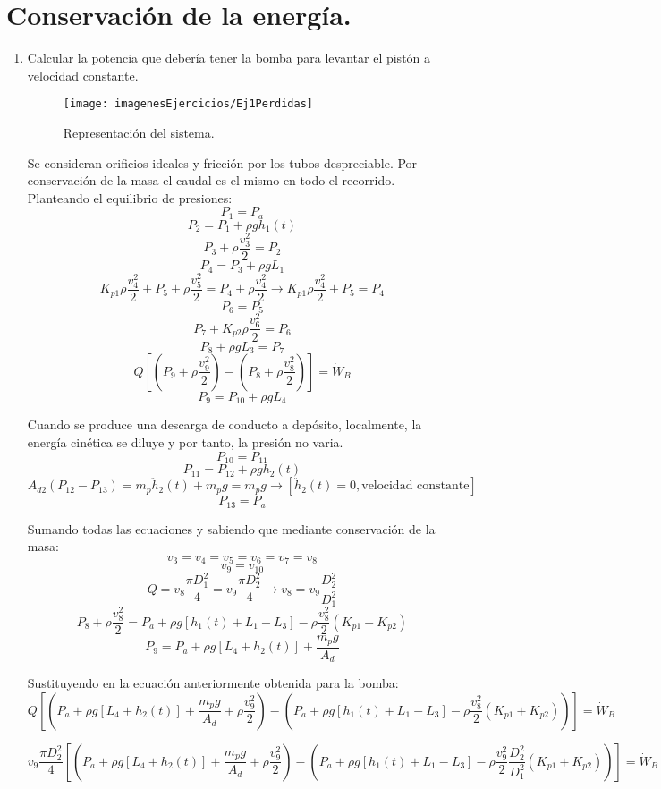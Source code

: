 \section{Conservación de la energía.}
\begin{enumerate}
	\item Calcular la potencia que debería tener la bomba para levantar el pistón a velocidad constante.
	\begin{figure}[H]
		\centering
		\texttt{[image: imagenesEjercicios/Ej1Perdidas]}
		\caption{Representación del sistema.}
		\label{fig:ej1perdidas}
	\end{figure}
	\blue
	Se consideran orificios ideales y fricción por los tubos despreciable. Por conservación de la masa el caudal es el mismo en todo el recorrido. Planteando el equilibrio de presiones:
	\[P_1=P_a\]
	\[P_2=P_1+\rho g h_1(t)\]
	\[P_3+\rho \dfrac{v_3^2}{2}=P_2\]
	\[P_4=P_3+\rho g L_1\]
	\[K_{p1}\rho\dfrac{v_4^2}{2}+P_5+\rho \dfrac{v_5^2}{2}=P_4+\rho \dfrac{v_4^2}{2} \rightarrow K_{p1}\rho\dfrac{v_4^2}{2}+P_5=P_4\]
	\[P_6=P_5\]
	\[P_7+K_{p2}\rho \dfrac{v_6^2}{2}=P_6\]
	\[P_8+\rho g L_3 =P_7\]
	\[Q\left[\left(P_9+\rho \dfrac{v_9^2}{2}\right)-\left(P_8+\rho \dfrac{v_8^2}{2}\right)\right]=\dot{W}_B\]
	\[P_9=P_{10}+\rho g L_4\]
	
	
	Cuando se produce una descarga de conducto a depósito, localmente, la energía cinética se diluye y por tanto, la presión no varia.
	\[P_{10}=P_{11}\]
	\[P_{11}=P_{12}+\rho g h_2(t)\]
	\[A_{d2}(P_{12}-P_{13})=m_p \ddot{h}_2(t)+m_p g=m_p g \rightarrow [\ddot{h}_2(t) = 0, \text{velocidad constante}]\]
	\[P_{13}=P_a\]
	
	
	Sumando todas las ecuaciones y sabiendo que mediante conservación de la masa:
	\[v_3=v_4=v_5=v_6=v_7=v_8\]
	\[v_9=v_{10}\]
	\[Q=v_8\dfrac{\pi D_1^2}{4}=v_9\dfrac{\pi D_2^2}{4} \rightarrow v_8= v_9\dfrac{D_2^2}{D_1^2}\]
	\[P_8+\rho\dfrac{v_8^2}{2}=P_a+\rho g \left[h_1(t)+L_1-L_3\right]-\rho\dfrac{v_8^2}{2}(K_{p1}+K_{p2})\]
	\[P_9=P_a+\rho g \left[L_4+h_2(t)\right]+\dfrac{m_p g}{A_d}\]
	
	
	Sustituyendo en la ecuación anteriormente obtenida para la bomba:
	\[Q\left[\left(P_a+\rho g \left[L_4+h_2(t)\right]+\dfrac{m_p g}{A_d}+\rho \dfrac{v_9^2}{2}\right)
	-\left(P_a+\rho g \left[h_1(t)+L_1-L_3\right]-\rho\dfrac{v_8^2}{2}(K_{p1}+K_{p2})\right)\right]=\dot{W}_B\]
	
	\[v_9\dfrac{\pi D_2^2}{4}\left[\left(P_a+\rho g \left[L_4+h_2(t)\right]+\dfrac{m_p g}{A_d}+\rho \dfrac{v_9^2}{2}\right)
	-\left(P_a+\rho g \left[h_1(t)+L_1-L_3\right]-\rho\dfrac{v_9^2}{2}\dfrac{D_2^2}{D_1^2}(K_{p1}+K_{p2})\right)\right]=\dot{W}_B\]
	

\end{enumerate}
